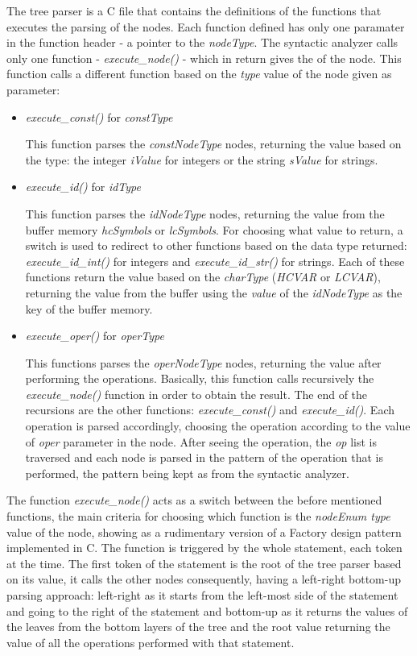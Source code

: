 \documentclass[12pt,a4paper,twoside]{report}
\begin{document}
The tree parser is a C file that contains the definitions of the functions that executes the parsing of the nodes. Each function defined has only one paramater in the function header - a pointer to the \textit{nodeType}. The syntactic analyzer calls only one function - \textit{execute\_node()} - which in return gives the of the node. This function calls a different function based on the \textit{type} value of the node given as parameter:

\begin{itemize}
	\item \textit{execute\_const()} for \textit{constType}
	
	This function parses the \textit{constNodeType} nodes, returning the value based on the type: the integer \textit{iValue} for integers or the string \textit{sValue} for strings. 
	
	\item \textit{execute\_id()} for \textit{idType}
	
	This function parses the \textit{idNodeType} nodes, returning the value from the buffer memory \textit{hcSymbols} or \textit{lcSymbols}. For choosing what value to return, a switch is used to redirect to other functions based on the data type returned: \textit{execute\_id\_int()} for integers and \textit{execute\_id\_str()} for strings. Each of these functions return the value based on the \textit{charType} (\textit{HCVAR} or \textit{LCVAR}), returning the value from the buffer using the \textit{value} of the \textit{idNodeType} as the key of the buffer memory. 
	
	\item \textit{execute\_oper()} for \textit{operType}
	
	This functions parses the \textit{operNodeType} nodes, returning the value after performing the operations. Basically, this function calls recursively the \textit{execute\_node()} function in order to obtain the result. The end of the recursions are the other functions: \textit{execute\_const()} and \textit{execute\_id()}. Each operation is parsed accordingly, choosing the operation according to the value of \textit{oper} parameter in the node. After seeing the operation, the \textit{op} list is traversed and each node is parsed in the pattern of the operation that is performed, the pattern being kept as from the syntactic analyzer.  
\end{itemize}

The function \textit{execute\_node()} acts as a switch between the before mentioned functions, the main criteria for choosing which function is the \textit{nodeEnum type} value of the node, showing as a rudimentary version of a Factory design pattern implemented in C.  The function is triggered by the whole statement, each token at the time. The first token of the statement is the root of the tree parser based on its value, it calls the other nodes consequently, having a left-right bottom-up parsing approach: left-right as it starts from the left-most side of the statement and going to the right of the statement and bottom-up as it returns the values of the leaves from the bottom layers of the tree and the root value returning the value of all the operations performed with that statement.
\end{document}
